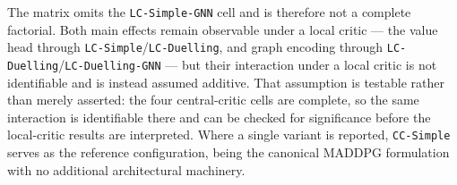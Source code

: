The matrix omits the \texttt{LC-Simple-GNN} cell and is therefore not a complete
factorial. Both main effects remain observable under a local critic --- the value
head through \texttt{LC-Simple}/\texttt{LC-Duelling}, and graph encoding through
\texttt{LC-Duelling}/\texttt{LC-Duelling-GNN} --- but their interaction under a
local critic is not identifiable and is instead assumed additive. That assumption
is testable rather than merely asserted: the four central-critic cells are
complete, so the same interaction is identifiable there and can be checked for
significance before the local-critic results are interpreted. Where a single
variant is reported, \texttt{CC-Simple} serves as the reference configuration,
being the canonical MADDPG formulation with no additional architectural machinery.
